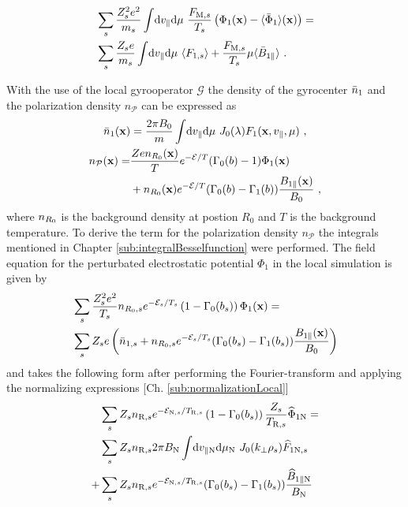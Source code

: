 \begin{gather}
	\begin{aligned}
		&\sum_s \frac{Z^2_s e^2}{m_s} \int \! \mathrm{d}v_\parallel\mathrm{d}\mu ~ \frac{F_{\mathrm{M},s}}{T_s} \left(\Phi_1(\boldsymbol{\mathbf{x}}) - \langle\bar{\Phi}_1\rangle(\boldsymbol{\mathbf{x}}) \right) =  \\
		&\sum_s \frac{Z_s e}{m_s} \int \! \mathrm{d}v_\parallel\mathrm{d}\mu ~ \langle F_{1,s}\rangle + \frac{F_{\mathrm{M},s}}{T_s} \mu \langle\bar{B}_{1\parallel}\rangle ~.
	\end{aligned}
	\label{eq:fieldPotential}
\end{gather}

With the use of the local gyrooperator $\mathcal{G}$ the density of the gyrocenter $\bar{n}_1$ and the polarization density $n_\mathcal{P}$ can be expressed as
\begin{gather}
	\bar{n}_1(\boldsymbol{\mathbf{x}}) = \frac{2\pi B_0}{m} \int \! \mathrm{d}v_\parallel\mathrm{d}\mu ~ J_0(\lambda) F_1(\boldsymbol{\mathbf{x}}, v_\parallel, \mu)~, \\
    \begin{aligned}
	    n_\mathcal{P}(\boldsymbol{\mathbf{x}}) = &\frac{Ze n_{R_0}(\boldsymbol{\mathbf{x}})}{T} e^{-\mathcal{E}/T} (\Gamma_0(b) - 1) \Phi_1(\boldsymbol{\mathbf{x}}) \\
                            &+ n_{R_0}(\boldsymbol{\mathbf{x}}) e^{-\mathcal{E}/T} (\Gamma_0(b) - \Gamma_1(b))\frac{B_{1\parallel}(\boldsymbol{\mathbf{x}})}{B_0}~,
    \end{aligned}
	\label{eq:particleDensityLocal}
\end{gather}
where $n_{R_0}$ is the background density at postion $R_0$ and $T$ is the background temperature. To derive the term for the polarization density $n_\mathcal{P}$ the integrals mentioned in Chapter \ref{sub:integralBesselfunction} were performed. The field equation for the perturbated electrostatic potential $\Phi_1$ in the local simulation is given by
\begin{gather}
    \begin{aligned}
        &\sum_s \frac{Z_s^2e^2}{T_s} n_{R_0,s} e^{-\mathcal{E}_s/T_s} \left(1 - \Gamma_0(b_s)\right) \Phi_1(\boldsymbol{\mathbf{x}}) = \\
        &\sum_s Z_se \left(\bar{n}_{1,s} + n_{R_0,s} e^{-\mathcal{E}_s/T_s} (\Gamma_0(b_s) - \Gamma_1(b_s))\frac{B_{1\parallel}(\boldsymbol{\mathbf{x}})}{B_0} \right)
        \label{eq:fieldPotentialLocal}
    \end{aligned}
\end{gather}
and takes the following form after performing the Fourier-transform and applying the normalizing expressions [Ch. \ref{sub:normalizationLocal}]
\begin{gather}
    \begin{aligned}
        &\sum_s Z_s n_{\mathrm{R},s} e^{-\mathcal{E}_{\mathrm{N},s}/T_{\mathrm{R},s}} \left(1 - \Gamma_0(b_s)\right) \frac{Z_s}{T_{\mathrm{R},s}} \widehat{\Phi}_{1 \mathrm{N}} = \\
        &\sum_s Z_sn_{\mathrm{R},s} 2\pi B_\mathrm{N} \int \! \mathrm{d}v_{\parallel \mathrm{N}} \mathrm{d}\mu_\mathrm{N} ~ J_0(k_\perp \rho_s) \widehat{F}_{1\mathrm{N},s} \\
        + & \sum_s Z_sn_{\mathrm{R},s} e^{-\mathcal{E}_{\mathrm{N},s}/T_{\mathrm{R},s}} (\Gamma_0(b_s) - \Gamma_1(b_s))\frac{\widehat{B}_{1\parallel \mathrm{N}}}{B_\mathrm{N}}
        \label{eq:fieldPotentialLocalNorm}
    \end{aligned}
\end{gather}
\newpage

